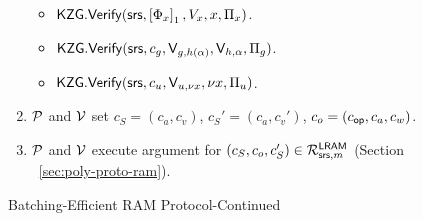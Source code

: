 \begin{figure}[t!]
\begin{mdframed}
\begin{enumerate}[leftmargin=1em, label=\arabic*.]
\begin{itemize}[leftmargin=1em]
                \item $\KZGverify(\srs, \gone{\Phi_x}, V_x, x, \Pi_x)$.
                \item $\KZGverify(\srs, c_g, \val{h(\alpha)}{g}, \val{\alpha}{h}, \Pi_g)$.
                \item $\KZGverify(\srs, c_u,\val{\nu x}{u}, \nu x, \Pi_u)$.
            \end{itemize}
            \item $\prover$ and $\verifier$ set $c_S=(c_a, c_v)$, $c_S'=(c_a, c_v')$, $c_o=(c_\op, c_a, c_w)$.
            \item $\prover$ and $\verifier$ execute argument for $(c_S, c_o, c_S')\in \CLRAM$ (Section ~\ref{sec:poly-proto-ram}).
        \end{enumerate}
    \end{mdframed}
    \caption{Batching-Efficient RAM Protocol-Continued}
    \label{fig:complete-listing-3}
\end{figure}
